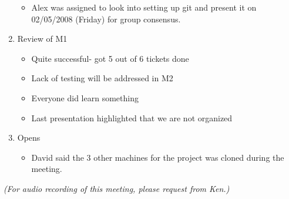 \documentclass{letter}
\begin{document}
\begin{enumerate}
\begin{itemize}
\begin{itemize}
\begin{itemize}
\begin{itemize}
								\end{itemize}
						\end{itemize}
				\end{itemize}
			\item Alex was assigned to look into setting up git and present it on 02/05/2008 (Friday) for group consensus.
		\end{itemize}
	\item Review of M1
		\begin{itemize}
			\item Quite successful- got 5 out of 6 tickets done
			\item Lack of testing will be addressed in M2
			\item Everyone did learn something
			\item Last presentation highlighted that we are not organized
		\end{itemize}
	\item Opens
		\begin{itemize}
			\item David said the 3 other machines for the project was cloned during the meeting. 
		\end{itemize}
\end{enumerate} 
\textsl{(For audio recording of this meeting, please request from Ken.)}
\end{document}
